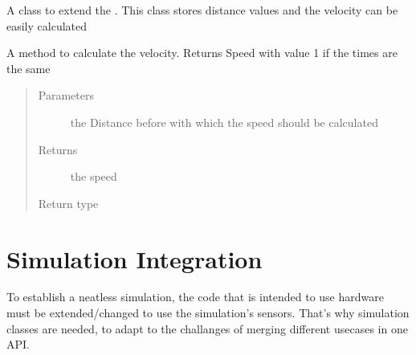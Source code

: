 \documentclass[letterpaper,10pt,english]{sphinxmanual}
\begin{document}
\begin{fulllineitems}
\label{\detokenize{data:lib.data.Distance}}
A class to extend the {\hyperref[\detokenize{data:lib.data.Data}]{}}. This class stores distance values and the
velocity can be easily calculated

\begin{fulllineitems}
\label{\detokenize{data:lib.data.Distance.velocity}}
A method to calculate the velocity. Returns Speed with value 1 if the times are the same
\begin{quote}\begin{description}
\item[{Parameters}] \leavevmode
{} \textendash{} the Distance before with which the speed should be calculated

\item[{Returns}] \leavevmode
the speed

\item[{Return type}] \leavevmode
{\hyperref[\detokenize{data:lib.data.Speed}]{}}

\end{description}\end{quote}

\end{fulllineitems}


\end{fulllineitems}


\ignorespaces 

\chapter{Simulation Integration}
\label{\detokenize{sim_interfaces:simulation-integration}}\label{\detokenize{sim_interfaces:index-0}}\label{\detokenize{sim_interfaces::doc}}
To establish a neatless simulation, the code that is intended to use hardware must be extended/changed to use the simulation’s
sensors. That’s why simulation classes are needed, to adapt to the challanges of merging different usecases in one API.
\end{document}

